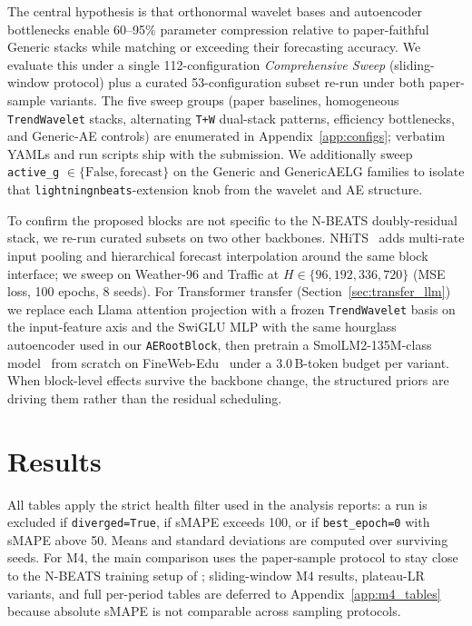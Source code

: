 \documentclass[11pt,a4paper]{article}
\begin{document}
The central hypothesis is that orthonormal wavelet bases and autoencoder bottlenecks enable 60--95\% parameter compression relative to paper-faithful Generic stacks while matching or exceeding their forecasting accuracy. We evaluate this under a single 112-configuration \emph{Comprehensive Sweep} (sliding-window protocol) plus a curated 53-configuration subset re-run under both paper-sample variants. The five sweep groups (paper baselines, homogeneous \texttt{TrendWavelet} stacks, alternating \texttt{T+W} dual-stack patterns, efficiency bottlenecks, and Generic-AE controls) are enumerated in Appendix~\ref{app:configs}; verbatim YAMLs and run scripts ship with the submission. We additionally sweep \texttt{active\_g} $\in \{\text{False}, \text{forecast}\}$ on the Generic and GenericAELG families to isolate that \texttt{lightningnbeats}-extension knob from the wavelet and AE structure.

To confirm the proposed blocks are not specific to the N-BEATS doubly-residual stack, we re-run curated subsets on two other backbones. NHiTS~\citep{challu2023nhits} adds multi-rate input pooling and hierarchical forecast interpolation around the same block interface; we sweep on Weather-96 and Traffic at $H \in \{96, 192, 336, 720\}$ (MSE loss, 100 epochs, 8 seeds). For Transformer transfer (Section~\ref{sec:transfer_llm}) we replace each Llama attention projection with a frozen \texttt{TrendWavelet} basis on the input-feature axis and the SwiGLU MLP with the same hourglass autoencoder used in our \texttt{AERootBlock}, then pretrain a SmolLM2-135M-class model~\citep{allal2025smollm2} from scratch on FineWeb-Edu~\citep{penedo2024fineweb} under a 3.0\,B-token budget per variant. When block-level effects survive the backbone change, the structured priors are driving them rather than the residual scheduling.


\section{Results}
\label{sec:results}

All tables apply the strict health filter used in the analysis reports: a run is excluded if \texttt{diverged=True}, if sMAPE exceeds 100, or if \texttt{best\_epoch=0} with sMAPE above 50. Means and standard deviations are computed over surviving seeds. For M4, the main comparison uses the paper-sample protocol to stay close to the N-BEATS training setup of \citet{oreshkin2020nbeats}; sliding-window M4 results, plateau-LR variants, and full per-period tables are deferred to Appendix~\ref{app:m4_tables} because absolute sMAPE is not comparable across sampling protocols.
\end{document}
